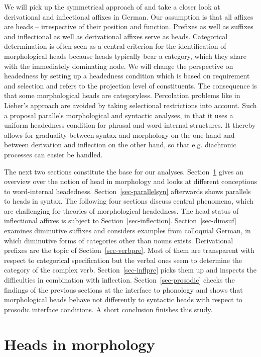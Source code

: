 \documentclass[output=paper
  ,nobabel
  ,draftmode
  ,colorlinks, citecolor=brown
]{langscibook}
\begin{document}
We will pick up the symmetrical approach of \citet{Lieber1981} and take a closer look at derivational and inflectional affixes in German. Our assumption is that all affixes are heads – irrespective of their position and function. Prefixes as well as suffixes and inflectional as well as derivational affixes serve as heads. Categorical determination is often seen as a central criterion for the identification of morphological heads because heads typically bear a category, which they share with the immediately dominating node. We will change the perspective on headedness by setting up a headedness condition which is based on requirement and selection and refers to the projection level of constituents. The consequence is that some morphological heads are categoryless. Percolation problems like in Lieber's approach are avoided by taking selectional restrictions into account. Such a proposal parallels morphological and syntactic analyses, in that it uses a uniform headedness condition for phrasal and word-internal structures. It thereby allows for graduality between syntax and morphology on the one hand and between derivation and inflection on the other hand, so that e.g. diachronic processes can easier be handled. 

The next two sections constitute the base for our analyses. Section~\ref{sec-headmorph} gives an overview over the notion of head in morphology and looks at different conceptions to word-internal headedness. Section~\ref{sec-parallelsyn} afterwards shows parallels to heads in syntax. The following four sections discuss central phenomena, which are challenging for theories of morphological headedness. The head status of inflectional affixes is subject to Section~\ref{sec-inflection}. Section~\ref{sec-dimsuf} examines diminutive suffixes and considers examples from colloquial German, in which diminutive forms of categories other than nouns exists. Derivational prefixes are the topic of Section~\ref{sec-verbpre}. Most of them are transparent with respect to categorical specification but the verbal ones seem to determine the category of the complex verb. Section~\ref{sec-inflpre} picks them up and inspects the difficulties in combination with inflection. Section~\ref{sec-prosodic} checks the findings of the previous sections at the interface to phonology and shows that morphological heads behave not differently to syntactic heads with respect to prosodic interface conditions. A short conclusion finishes this study.

\section{Heads in morphology}\label{sec-headmorph}
\end{document}
